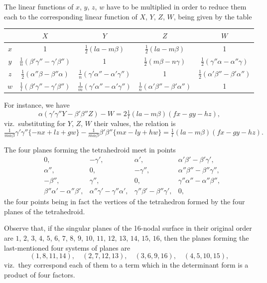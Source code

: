 \documentclass[11pt,a4paper]{book}
\begin{document}
\clearpage
The linear functions of $x$, $y$, $z$, $w$ have to be multiplied in order to reduce them each to the corresponding linear function of $X$, $Y$, $Z$, $W$, being given by the table
\begin{center}
\begin{tabular}{c|cccc}
& $X$ & $Y$ & $Z$ & $W$ \\
\hline
$x$ & 1 & $\frac{1}{2}(la - m\beta)$ & $\frac{1}{2}(la - m\beta)$ & 1 \\
$y$ & $\frac{1}{n}(\beta'\gamma'' - \gamma'\beta'')$ & 1 & $\frac{1}{2}(m\beta - n\gamma)$ & $\frac{1}{2}(\gamma''\alpha - \alpha''\gamma)$ \\
$z$ & $\frac{1}{2}(\alpha''\beta - \beta''\alpha)$ & $\frac{1}{n}(\gamma'\alpha'' - \alpha'\gamma'')$ & 1 & $\frac{1}{2}(\alpha'\beta'' - \beta'\alpha'')$ \\
$w$ & $\frac{1}{l}(\beta'\gamma'' - \gamma'\beta'')$ & $\frac{1}{m}(\gamma'\alpha'' - \alpha'\gamma'')$ & $\frac{1}{n}(\alpha'\beta'' - \beta'\alpha'')$ & 1
\end{tabular}
\end{center}
For instance, we have
\[
\alpha(\gamma'\gamma''Y - \beta'\beta''Z) - W = 2\tfrac{1}{l}(la - m\beta)(fx - gy - hz),
\]
viz.\ substituting for $Y$, $Z$, $W$ their values, the relation is
\[
\tfrac{1}{m\alpha\beta}\gamma'\gamma''\{-nx + lz + gw\} - \tfrac{1}{m\alpha\beta}\beta'\beta''\{mx - ly + hw\} = \tfrac{1}{l}(la - m\beta)(fx - gy - hz).
\]

\clearpage
The four planes forming the tetrahedroid meet in points
\begin{align*}
& 0, & -\gamma', & \alpha', & \alpha'\beta' - \beta'\gamma', \\
& \alpha'', & 0, & -\gamma'', & \alpha''\beta'' - \beta''\gamma'', \\
& -\beta'', & \gamma'', & 0, & \gamma''\alpha'' - \alpha''\beta'', \\
& \beta''\alpha' - \alpha''\beta', & \alpha''\gamma' - \gamma''\alpha', & \gamma''\beta' - \beta''\gamma', & 0,
\end{align*}
the four points being in fact the vertices of the tetrahedron formed by the four planes of the tetrahedroid.

Observe that, if the singular planes of the 16-nodal surface in their original order are $1$, $2$, $3$, $4$, $5$, $6$, $7$, $8$, $9$, $10$, $11$, $12$, $13$, $14$, $15$, $16$, then the planes forming the last-mentioned four systems of planes are
\[
(1, 8, 11, 14), \quad (2, 7, 12, 13), \quad (3, 6, 9, 16), \quad (4, 5, 10, 15),
\]
viz.\ they correspond each of them to a term which in the determinant form is a product of four factors.
\end{document}
